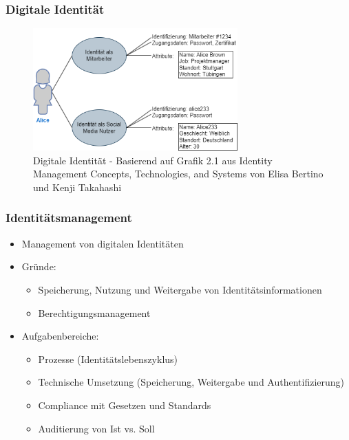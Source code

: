 \documentclass[11pt]{beamer}
\begin{document}
\begin{frame}
  \frametitle{Digitale Identität}
  \begin{figure}[H]
    \centering
    \includegraphics[width=0.7\textwidth]{assets/identity.png}
    \caption{Digitale Identität - Basierend auf Grafik 2.1 aus \glqq{}Identity Management Concepts, Technologies, and Systems\grqq{} von Elisa Bertino und Kenji Takahashi}
  \end{figure}
\end{frame}
\begin{frame}
  \frametitle{Identitätsmanagement}
  \begin{itemize}
    \item Management von digitalen Identitäten
    \item Gründe:
          \begin{itemize}
            \item Speicherung, Nutzung und Weitergabe von Identitätsinformationen
            \item Berechtigungsmanagement
          \end{itemize}
    \item Aufgabenbereiche:
          \begin{itemize}
            \item Prozesse (Identitätslebenszyklus)
            \item Technische Umsetzung (Speicherung, Weitergabe und Authentifizierung)
            \item Compliance mit Gesetzen und Standards
            \item Auditierung von Ist vs. Soll
          \end{itemize}
  \end{itemize}
\end{frame}
\end{document}
